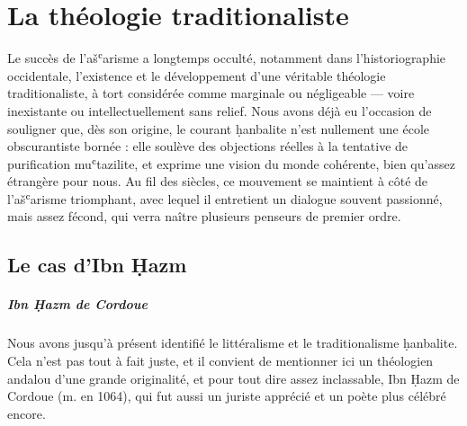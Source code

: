 \chapter{La théologie traditionaliste}

\hypertarget{suxe9ance-6}{%
\label{suxe9ance-6}}

Le succès de l'ašʿarisme a longtemps occulté, notamment dans
l'historiographie occidentale, l'existence et le développement d'une
véritable théologie traditionaliste, à tort considérée comme marginale
ou négligeable --- voire inexistante ou intellectuellement sans relief.
Nous avons déjà eu l'occasion de souligner que, dès son origine, le
courant ḥanbalite n'est nullement une école obscurantiste bornée : elle
soulève des objections réelles à la tentative de purification
muʿtazilite, et exprime une vision du monde cohérente, bien qu'assez
étrangère pour nous. Au fil des siècles, ce mouvement se maintient à
côté de l'ašʿarisme triomphant, avec lequel il entretient un dialogue
souvent passionné, mais assez fécond, qui verra naître plusieurs
penseurs de premier ordre.

\hypertarget{le-cas-dibn-ux1e25azm}{%
\section{Le cas d'Ibn Ḥazm}\label{le-cas-dibn-ux1e25azm}}

\paragraph{Ibn Ḥazm de Cordoue}Nous avons jusqu'à présent identifié le littéralisme et le
traditionalisme ḥanbalite. Cela n'est pas tout à fait juste, et il
convient de mentionner ici un théologien andalou d'une grande
originalité, et pour tout dire assez inclassable, Ibn Ḥazm de Cordoue \label{Theol:IbnHazmCordoue}
(m. en 1064), qui fut aussi un juriste apprécié et un poète plus célébré
encore.

